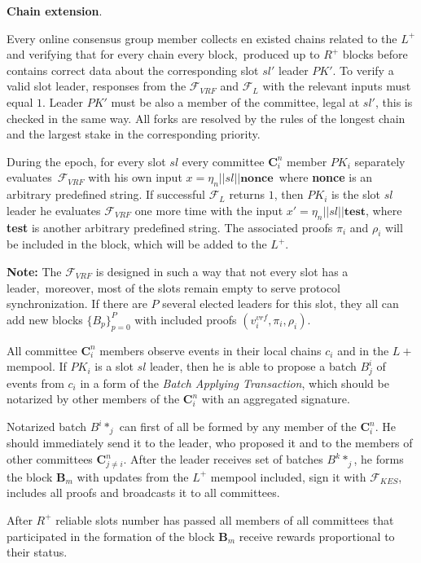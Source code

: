 \begin{legal}
    \item \textbf{Chain extension}.
    \begin{legal}

        \item Every online consensus group member collects en existed chains related to the $L^+$ and verifying that for every chain every block,\
        produced up to $R^+$ blocks before contains correct data about the corresponding slot $sl'$ leader $PK'$.
        To verify a valid slot leader, responses from the ${\mathcal{F}}_{VRF}$ and ${\mathcal{F}}_{L}$ with the relevant inputs must equal $1$. Leader $PK'$ must be also a member of the committee, legal at $sl'$, this is checked in the same way. All forks are resolved by the rules of the longest chain and the largest stake in the corresponding priority.

        \item During the epoch, for every slot $sl$ every committee $\mathbf{C}_i^n$ member $PK_i$ separately evaluates\
        ${\mathcal{F}}_{VRF}$ with his own input ${x = \eta_n || sl || \textbf{nonce}}$\, where \textbf{nonce} is an arbitrary predefined string.
        If successful ${\mathcal{F}}_{L}$ returns $1$, then $PK_i$ is the slot $sl$ leader he evaluates ${\mathcal{F}}_{VRF}$ one more time with the input ${x' = \eta_n || sl || \textbf{test}}$, where \textbf{test} is another arbitrary predefined string.
        The associated proofs $\pi_i$ and $\rho_i$ will be included in the block, which will be added to the $L^+$.

        \textbf{Note:} The ${\mathcal{F}}_{VRF}$ is designed in such a way that not every slot has a leader,\
        moreover, most of the slots remain empty to serve protocol synchronization.
        If there are $P$ several elected leaders for this slot, they all can add new blocks
        $\{B_p\}_{p=0}^P$ with included proofs ${(v_i^{vrf}, \pi_i, \rho_i)}$.

        \item All committee $\mathbf{C}_i^n$ members observe events in their local chains $c_i$ and in the $L+$ mempool.
        If $PK_i$ is a slot $sl$ leader, then he is able to propose a batch $B^i_j$ of events from $c_i$ in a form of the \textit{Batch Applying Transaction}, which should be notarized by other members of the $\mathbf{C}_i^n$ with an aggregated signature.

        \item Notarized batch $B^i*_j$ can first of all be formed by any member of the $\mathbf{C}_i^n$.
        He should immediately send it to the leader, who proposed it and to the members of other committees $\mathbf{C}_{j\neq i}^n$.
        After the leader receives set of batches ${B^k*_j}$, he forms the block $\mathbf{B}_m$ with updates from the $L^+$ mempool included, sign it with ${\mathcal{F}}_{KES}$, includes all proofs and broadcasts it to all committees.

        \item After $R^+$ reliable slots number has passed all members of all committees that participated in the formation of the block $\mathbf{B}_m$ receive rewards proportional to their status.
    \end{legal}
\end{legal}
